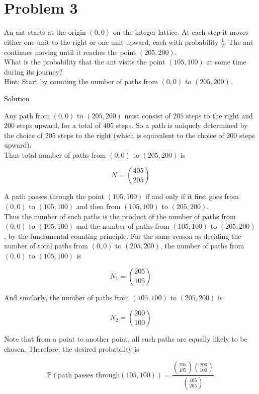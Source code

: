 \section{Problem 3}\label{hw01-problem-3}

An ant starts at the origin \((0,0)\) on the integer lattice. At each step it moves either one unit to the right or one unit upward, each with probability \(\frac{1}{2}\). The ant continues moving until it reaches the point \((205,200)\).\\
What is the probability that the ant visits the point \((105,100)\) at some time during its journey?\\
Hint: Start by counting the number of paths from \((0,0)\) to \((205,200)\).

\begin{qlsolution}{Solution}

Any path from \((0,0)\) to \((205,200)\) must consist of \(205\) steps to the right and \(200\) steps upward, for a total of \(405\) steps. So a path is uniquely determined by the choice of 205 steps to the right (which is equivalent to the choice of 200 steps upward).\\
Thus total number of paths from \((0,0)\) to \((205,200)\) is

\[\mathit{N} = \binom{405}{205}\]

A path passes through the point \((105,100)\) if and only if it first goes from \((0,0)\) to \((105,100)\) and then from \((105,100)\) to \((205,200)\).\\
Thus the number of such paths is the product of the number of paths from \((0,0)\) to \((105,100)\) and the number of paths from \((105,100)\) to \((205,200)\), by the fundamental counting principle. For the same reason as deciding the number of total paths from \((0,0)\) to \((205,200)\), the number of paths from \((0,0)\) to \((105,100)\) is

\[\mathit{N}_{1} = \binom{205}{105}\]

And similarly, the number of paths from \((105,100)\) to \((205,200)\) is

\[\mathit{N}_{2} = \binom{200}{100}\]

Note that from a point to another point, all such paths are equally likely to be chosen. Therefore, the desired probability is

\[\mathbb{P}(\text{path passes through}(105,100)) = \frac{\binom{205}{105}\binom{200}{100}}{\binom{405}{205}}\]

\end{qlsolution}

